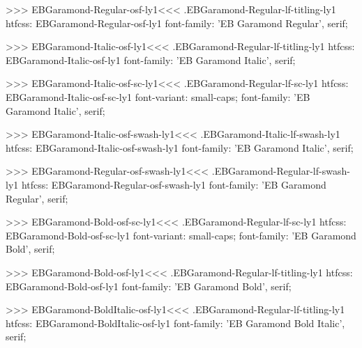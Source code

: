 {{>>>
\<EBGaramond-Regular-osf-ly1\><<<
.EBGaramond-Regular-lf-titling-ly1
htfcss:  EBGaramond-Regular-osf-ly1  font-family: 'EB Garamond Regular', serif;

>>>
\<EBGaramond-Italic-osf-ly1\><<<
.EBGaramond-Regular-lf-titling-ly1
htfcss:  EBGaramond-Italic-osf-ly1  font-family: 'EB Garamond Italic', serif;

>>>
\<EBGaramond-Italic-osf-sc-ly1\><<<
.EBGaramond-Regular-lf-sc-ly1
htfcss:  EBGaramond-Italic-osf-sc-ly1  font-variant: small-caps; font-family: 'EB Garamond Italic', serif;

>>>
\<EBGaramond-Italic-osf-swash-ly1\><<<
.EBGaramond-Italic-lf-swash-ly1
htfcss:  EBGaramond-Italic-osf-swash-ly1  font-family: 'EB Garamond Italic', serif;

>>>
\<EBGaramond-Regular-osf-swash-ly1\><<<
.EBGaramond-Regular-lf-swash-ly1
htfcss:  EBGaramond-Regular-osf-swash-ly1  font-family: 'EB Garamond Regular', serif;

>>>
\<EBGaramond-Bold-osf-sc-ly1\><<<
.EBGaramond-Regular-lf-sc-ly1
htfcss:  EBGaramond-Bold-osf-sc-ly1  font-variant: small-caps; font-family: 'EB Garamond Bold', serif;

>>>
\<EBGaramond-Bold-osf-ly1\><<<
.EBGaramond-Regular-lf-titling-ly1
htfcss:  EBGaramond-Bold-osf-ly1  font-family: 'EB Garamond Bold', serif;

>>>
\<EBGaramond-BoldItalic-osf-ly1\><<<
.EBGaramond-Regular-lf-titling-ly1
htfcss:  EBGaramond-BoldItalic-osf-ly1  font-family: 'EB Garamond Bold Italic', serif;

}}
